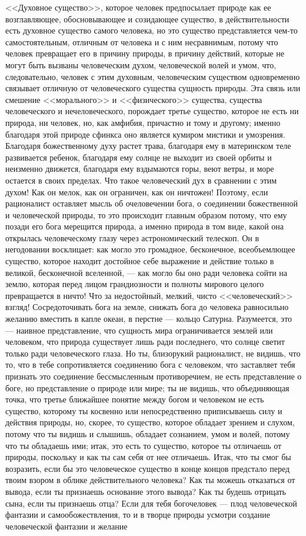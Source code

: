 \documentclass[12pt]{article}
\begin{document}
<<Духовное существо>>, которое человек предпосылает природе как ее возглавляющее, обосновывающее и созидающее существо, в действительности есть духовное существо самого человека, но это существо представляется чем-то самостоятельным, отличным от человека и с ним несравнимым, потому что человек превращает его в причину природы, в причину действий, которые не могут быть вызваны человеческим духом, человеческой волей и умом, что, следовательно, человек с этим духовным, человеческим существом одновременно связывает отличную от человеческого существа сущность природы. Эта связь или смешение <<морального>> и <<физического>> существа, существа человеческого и нечеловеческого, порождает третье существо, которое не есть ни природа, ни человек, но, как амфибия, причастно и тому и другому; именно благодаря этой природе сфинкса оно является кумиром мистики и умозрения. Благодаря божественному духу растет трава, благодаря ему в материнском теле развивается ребенок, благодаря ему солнце не выходит из своей орбиты и неизменно движется, благодаря ему вздымаются горы, веют ветры, и море остается в своих пределах. Что такое человеческий дух в сравнении с этим духом! Как он мелок, как он ограничен, как он ничтожен! Поэтому, если рационалист оставляет мысль об очеловечении бога, о соединении божественной и человеческой природы, то это происходит главным образом потому, что ему позади его бога мерещится природа, а именно природа в том виде, какой она открылась человеческому глазу через астрономический телескоп. Он в негодовании восклицает: как могло это громадное, бесконечное, всеобъемлющее существо, которое находит достойное себе выражение и действие только в великой, бесконечной вселенной, --- как могло бы оно ради человека сойти на землю, которая перед лицом грандиозности и полноты мирового целого превращается в ничто! Что за недостойный, мелкий, чисто <<человеческий>> взгляд! Сосредоточивать бога на земле, снижать бога до человека равносильно желанию вместить в капле океан, в перстне --- кольцо Сатурна. Разумеется, это --- наивное представление, что сущность мира ограничивается землей или человеком, что природа существует лишь ради последнего, что солнце светит только ради человеческого глаза. Но ты, близорукий рационалист, не видишь, что то, что в тебе сопротивляется соединению бога с человеком, что заставляет тебя признать это соединение бессмысленным противоречием, не есть представление о боге, но представление о природе или мире; ты не видишь, что объединяющая точка, что третье ближайшее понятие между богом и человеком не есть существо, которому ты косвенно или непосредственно приписываешь силу и действия природы, но, скорее, то существо, которое обладает зрением и слухом, потому что ты видишь и слышишь, обладает сознанием, умом и волей, потому что ты обладаешь ими; итак, это есть то существо, которое ты отличаешь от природы, поскольку и как ты сам себя от нее отличаешь. Итак, что ты смог бы возразить, если бы это человеческое существо в конце концов предстало перед твоим взором в облике действительного человека? Как ты можешь отказаться от вывода, если ты признаешь основание этого вывода? Как ты будешь отрицать сына, если ты признаешь отца? Если для тебя богочеловек --- плод человеческой фантазии и самообожествления, то и в творце природы усмотри создание человеческой фантазии и желание 
\end{document}
